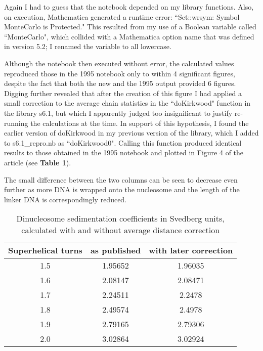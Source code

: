 \begin{enumerate}
Again I had to guess that the notebook depended on my library functions. Also, on execution, Mathematica generated a runtime error: ``Set::wrsym: Symbol MonteCarlo is Protected." This resulted from my use of a Boolean variable called ``MonteCarlo", which collided with a Mathematica option name that was defined in version 5.2; I renamed the variable to all lowercase.

Although the notebook then executed without error, the calculated values reproduced those in the 1995 notebook only to within 4 significant figures, despite the fact that both the new and the 1995 output provided 6 figures. Digging further revealed that after the creation of this figure I had applied a small correction to the average chain statistics in the ``doKirkwood" function in the library s6.1, but which I apparently judged too insignificant to justify re-running the calculations at the time. In support of this hypothesis, I found the earlier version of doKirkwood in my previous version of the library, which I added to s6.1\_repro.nb as ``doKirkwood0". Calling this function produced identical results to those obtained in the 1995 notebook and plotted in Figure 4 of the article (see \textbf{Table 1}).

The small difference between the two columns can be seen to decrease even further as more DNA is wrapped onto the nucleosome and the length of the linker DNA is correspondingly reduced.
\begin{table}[H]
\caption{Dinucleosome sedimentation coefficients in Svedberg units, calculated with and without average distance correction}
\begin{center}
\begin{tabular}{c|c|c}
Superhelical turns & as published & with later correction \\
\hline
1.5	& 1.95652 & 1.96035 \\
1.6	& 2.08147 & 2.08471 \\
1.7	& 2.24511 & 2.2478 \\
1.8	& 2.49574 & 2.4978 \\
1.9	& 2.79165 & 2.79306 \\
2.0	& 3.02864 & 3.02924 \\
\end{tabular}
\end{center}
\label{default}
\end{table}



\end{enumerate}
